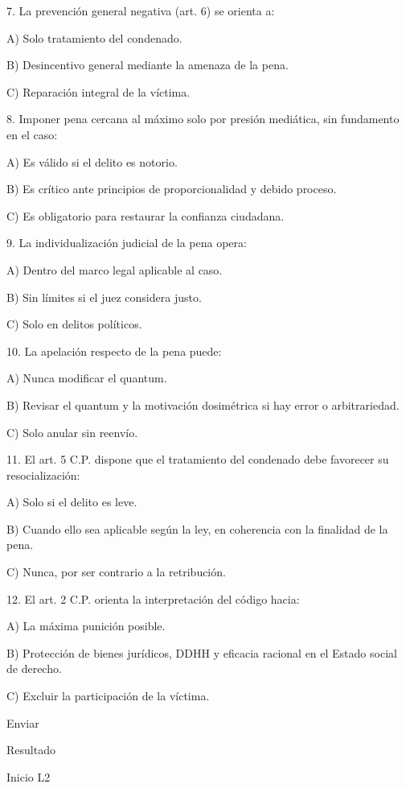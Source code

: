 \documentclass[11pt,a4paper]{article}
\begin{document}
      7. La prevención general negativa (art. 6) se orienta a:\par

         A) Solo tratamiento del condenado.\par
         B) Desincentivo general mediante la amenaza de la pena.\par
         C) Reparación integral de la víctima.\par


      8. Imponer pena cercana al máximo solo por presión mediática, sin fundamento en el caso:\par

         A) Es válido si el delito es notorio.\par
         B) Es crítico ante principios de proporcionalidad y debido proceso.\par
         C) Es obligatorio para restaurar la confianza ciudadana.\par


      9. La individualización judicial de la pena opera:\par

         A) Dentro del marco legal aplicable al caso.\par
         B) Sin límites si el juez considera justo.\par
         C) Solo en delitos políticos.\par


      10. La apelación respecto de la pena puede:\par

         A) Nunca modificar el quantum.\par
         B) Revisar el quantum y la motivación dosimétrica si hay error o arbitrariedad.\par
         C) Solo anular sin reenvío.\par


      11. El art. 5 C.P. dispone que el tratamiento del condenado debe favorecer su resocialización:\par

         A) Solo si el delito es leve.\par
         B) Cuando ello sea aplicable según la ley, en coherencia con la finalidad de la pena.\par
         C) Nunca, por ser contrario a la retribución.\par


      12. El art. 2 C.P. orienta la interpretación del código hacia:\par

         A) La máxima punición posible.\par
         B) Protección de bienes jurídicos, DDHH y eficacia racional en el Estado social de derecho.\par
         C) Excluir la participación de la víctima.\par


      Enviar\par


      Resultado\par









    Inicio L2\par
\end{document}
